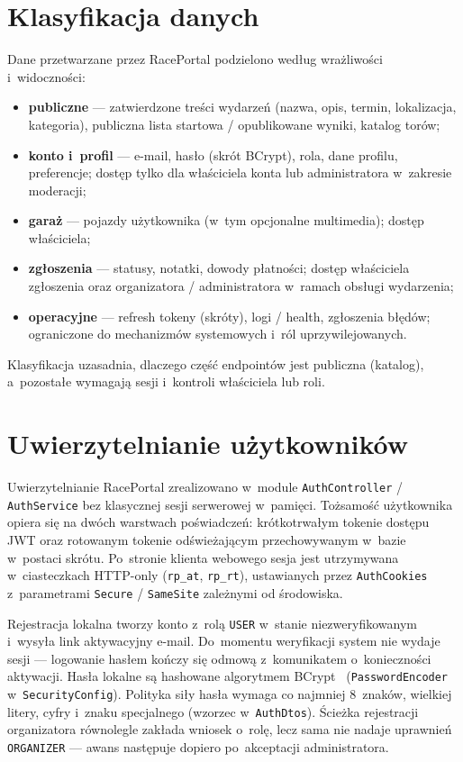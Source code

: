 \documentclass{sprz}
\begin{document}
\section{Klasyfikacja danych}
Dane przetwarzane przez RacePortal podzielono według wrażliwości i~widoczności:
\begin{itemize}
  \item \textbf{publiczne} --- zatwierdzone treści wydarzeń (nazwa, opis, termin, lokalizacja, kategoria), publiczna lista startowa / opublikowane wyniki, katalog torów;
  \item \textbf{konto i~profil} --- e-mail, hasło (skrót BCrypt), rola, dane profilu, preferencje; dostęp tylko dla właściciela konta lub administratora w~zakresie moderacji;
  \item \textbf{garaż} --- pojazdy użytkownika (w~tym opcjonalne multimedia); dostęp właściciela;
  \item \textbf{zgłoszenia} --- statusy, notatki, dowody płatności; dostęp właściciela zgłoszenia oraz organizatora / administratora w~ramach obsługi wydarzenia;
  \item \textbf{operacyjne} --- refresh tokeny (skróty), logi / health, zgłoszenia błędów; ograniczone do mechanizmów systemowych i~ról uprzywilejowanych.
\end{itemize}
Klasyfikacja uzasadnia, dlaczego część endpointów jest publiczna (katalog), a~pozostałe wymagają sesji i~kontroli właściciela lub roli.

\section{Uwierzytelnianie użytkowników}
Uwierzytelnianie RacePortal zrealizowano w~module \texttt{AuthController} / \texttt{AuthService} bez klasycznej sesji serwerowej w~pamięci. Tożsamość użytkownika opiera się na dwóch warstwach poświadczeń: krótkotrwałym tokenie dostępu JWT oraz rotowanym tokenie odświeżającym przechowywanym w~bazie w~postaci skrótu. Po~stronie klienta webowego sesja jest utrzymywana w~ciasteczkach HTTP-only (\texttt{rp\_at}, \texttt{rp\_rt}), ustawianych przez \texttt{AuthCookies} z~parametrami \texttt{Secure} / \texttt{SameSite} zależnymi od środowiska.

Rejestracja lokalna tworzy konto z~rolą \texttt{USER} w~stanie niezweryfikowanym i~wysyła link aktywacyjny e-mail. Do~momentu weryfikacji system nie wydaje sesji --- logowanie hasłem kończy się odmową z~komunikatem o~konieczności aktywacji. Hasła lokalne są hashowane algorytmem BCrypt~\cite{bcrypt:openbsd} (\texttt{PasswordEncoder} w~\texttt{SecurityConfig}). Polityka siły hasła wymaga co najmniej 8~znaków, wielkiej litery, cyfry i~znaku specjalnego (wzorzec w~\texttt{AuthDtos}). Ścieżka rejestracji organizatora równolegle zakłada wniosek o~rolę, lecz sama nie nadaje uprawnień \texttt{ORGANIZER} --- awans następuje dopiero po~akceptacji administratora.
\end{document}
